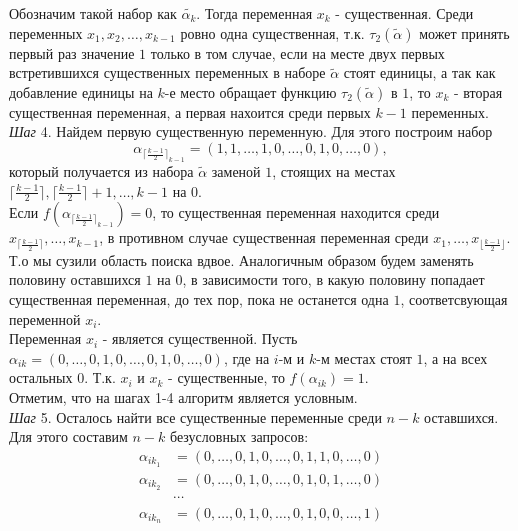 \documentclass[oneside, final, 14pt]{extreport}
\begin{document}
	 Обозначим такой набор как $\tilde{\alpha_k}$. Тогда переменная  $x_k$ - существенная.
	 Среди переменных $x_1, x_2, \ldots, x_{k-1}$ ровно одна существенная, т.к. $\tau_2(\tilde{\alpha})$ может принять первый раз значение $1$ только в 
	 том случае, если на месте двух первых встретившихся существенных переменных в наборе $\tilde{\alpha}$ стоят единицы, 
	 а так как добавление единицы на $k$-е место обращает функцию $\tau_2(\tilde{\alpha})$ в $1$, то $x_k$ -  вторая существенная переменная, 
	 а первая нахоится среди первых $k-1$ переменных. \\
	\emph{Шаг} 4. Найдем первую существенную переменную. Для этого построим набор 
	$${\alpha_{\lceil \frac{k-1}{2}\rceil_{k-1}}} = (1, 1, \ldots, 1, 0, \ldots, 0, 1, 0, \ldots, 0),$$
	 который получается из набора $\tilde{\alpha}$ заменой $1$, стоящих на местах $\lceil \frac{k-1}{2} \rceil, \lceil \frac{k-1}{2} \rceil + 1, \ldots, k-1$ на $0$. \\
	 Если $f({\alpha_{\lceil\frac{k-1}{2}\rceil_{k-1}}}) = 0$, то существенная переменная находится среди $x_{\lceil\frac{k-1}{2}\rceil}, \ldots, x_{k-1}$, в противном
	 случае существенная переменная среди $x_1, \ldots, x_{\lfloor \frac{k-1}{2} \rfloor}$. Т.о мы сузили область поиска вдвое. Аналогичным образом 
	 будем заменять половину оставшихся $1$ на $0$, в зависимости  того, в какую половину попадает существенная переменная, до тех пор, пока не останется 
	 одна $1$, соответсвующая переменной $x_i$. \\
	 Переменная $x_i$ - является существенной. Пусть $\alpha_{ik} = (0, \ldots,0, 1, 0, \ldots, 0, 1, 0, \ldots, 0)$, где на $i$-м и  $k$-м местах стоят $1$, а на всех 
	 остальных $0$. Т.к. $x_i$ и $x_k$ - существенные, то  $f(\alpha_{ik}) = 1$. \\
	 Отметим, что на шагах 1-4 алгоритм является условным.\\
	 \emph{Шаг} 5. Осталось найти все существенные переменные среди $n-k$ оставшихся. Для этого составим $n-k$ безусловных запросов: 
	 \begin{displaymath}
	 \begin{aligned}
	 	\alpha_{ik_1} & = (0, \ldots,0, 1, 0, \ldots, 0, 1, 1, 0, \ldots, 0) \\
	 	\alpha_{ik_2} & = (0, \ldots,0, 1, 0, \ldots, 0, 1, 0, 1, \ldots, 0) \\
	 	                    & \cdots \\
	 	\alpha_{ik_n} & = (0, \ldots,0, 1, 0, \ldots, 0, 1, 0, 0, \ldots, 1)
	 \end{aligned}
	 \end{displaymath}
	
\end{document}

